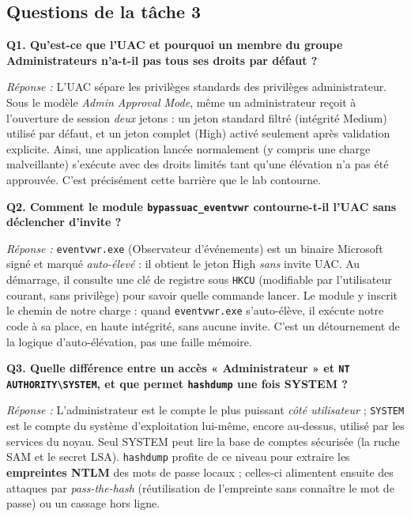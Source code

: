 \documentclass[11pt,a4paper]{article}
\begin{document}
\subsection{Questions de la tâche 3}
\textbf{Q1. Qu'est-ce que l'UAC et pourquoi un membre du groupe Administrateurs n'a-t-il pas tous ses droits par défaut ?}

\textit{Réponse :} L'UAC sépare les privilèges standards des privilèges administrateur. Sous
le modèle \emph{Admin Approval Mode}, même un administrateur reçoit à l'ouverture de session
\emph{deux} jetons : un jeton standard filtré (intégrité Medium) utilisé par défaut, et un
jeton complet (High) activé seulement après validation explicite. Ainsi, une application
lancée normalement (y compris une charge malveillante) s'exécute avec des droits limités
tant qu'une élévation n'a pas été approuvée. C'est précisément cette barrière que le lab
contourne.

\medskip\noindent\textbf{Q2. Comment le module \texttt{bypassuac\_eventvwr} contourne-t-il l'UAC sans déclencher d'invite ?}

\textit{Réponse :} \texttt{eventvwr.exe} (Observateur d'événements) est un binaire Microsoft
signé et marqué \emph{auto-élevé} : il obtient le jeton High \emph{sans} invite UAC. Au
démarrage, il consulte une clé de registre sous \texttt{HKCU} (modifiable par l'utilisateur
courant, sans privilège) pour savoir quelle commande lancer. Le module y inscrit le chemin de
notre charge : quand \texttt{eventvwr.exe} s'auto-élève, il exécute notre code à sa place, en
haute intégrité, sans aucune invite. C'est un détournement de la logique d'auto-élévation,
pas une faille mémoire.

\medskip\noindent\textbf{Q3. Quelle différence entre un accès « Administrateur » et \texttt{NT AUTHORITY\textbackslash SYSTEM}, et que permet \texttt{hashdump} une fois SYSTEM ?}

\textit{Réponse :} L'administrateur est le compte le plus puissant \emph{côté utilisateur} ;
\texttt{SYSTEM} est le compte du système d'exploitation lui-même, encore au-dessus, utilisé
par les services du noyau. Seul SYSTEM peut lire la base de comptes sécurisée (la ruche SAM et
le secret LSA). \texttt{hashdump} profite de ce niveau pour extraire les \textbf{empreintes
NTLM} des mots de passe locaux ; celles-ci alimentent ensuite des attaques par
\emph{pass-the-hash} (réutilisation de l'empreinte sans connaître le mot de passe) ou un
cassage hors ligne.

\end{document}
